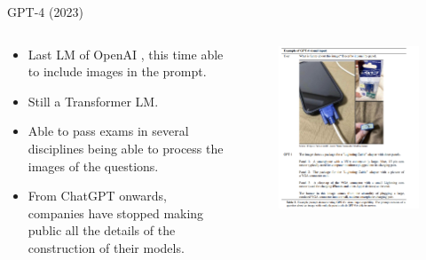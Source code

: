 \documentclass[handout]{beamer}
\begin{document}
\begin{frame}{GPT-4 (2023)}
\begin{columns}[T]
\begin{column}{0.5\textwidth}
\begin{scriptsize}
\begin{itemize}
\item Last LM of OpenAI \cite{openai2023gpt4}, this time able to include images in the prompt.
\item Still a Transformer LM.
\item Able to pass exams in several disciplines being able to process the images of the questions.
\item From ChatGPT onwards, companies have stopped making public all the details of the construction of their models.
\end{itemize}
\end{scriptsize}
\end{column}
\begin{column}{0.5\textwidth}
\begin{figure}[h]
	\includegraphics[scale = 0.35]{pics/gpt4.png}
\end{figure}
\end{column}
\end{columns}
\end{frame}
\end{document}
